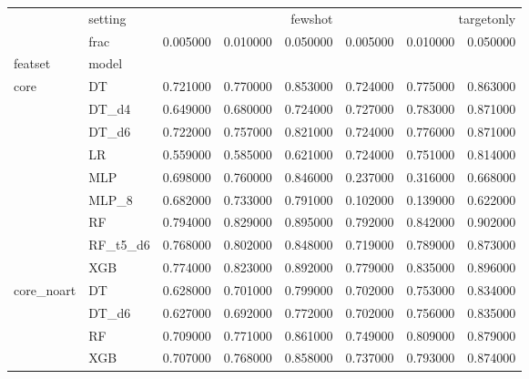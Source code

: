 \begin{tabular}{llrrrrrr}
\toprule
 & setting & \multicolumn{3}{r}{fewshot} & \multicolumn{3}{r}{targetonly} \\
 & frac & 0.005000 & 0.010000 & 0.050000 & 0.005000 & 0.010000 & 0.050000 \\
featset & model &  &  &  &  &  &  \\
\midrule
\multirow[t]{9}{*}{core} & DT & 0.721000 & 0.770000 & 0.853000 & 0.724000 & 0.775000 & 0.863000 \\
 & DT_d4 & 0.649000 & 0.680000 & 0.724000 & 0.727000 & 0.783000 & 0.871000 \\
 & DT_d6 & 0.722000 & 0.757000 & 0.821000 & 0.724000 & 0.776000 & 0.871000 \\
 & LR & 0.559000 & 0.585000 & 0.621000 & 0.724000 & 0.751000 & 0.814000 \\
 & MLP & 0.698000 & 0.760000 & 0.846000 & 0.237000 & 0.316000 & 0.668000 \\
 & MLP_8 & 0.682000 & 0.733000 & 0.791000 & 0.102000 & 0.139000 & 0.622000 \\
 & RF & 0.794000 & 0.829000 & 0.895000 & 0.792000 & 0.842000 & 0.902000 \\
 & RF_t5_d6 & 0.768000 & 0.802000 & 0.848000 & 0.719000 & 0.789000 & 0.873000 \\
 & XGB & 0.774000 & 0.823000 & 0.892000 & 0.779000 & 0.835000 & 0.896000 \\
\cline{1-8}
\multirow[t]{4}{*}{core_noart} & DT & 0.628000 & 0.701000 & 0.799000 & 0.702000 & 0.753000 & 0.834000 \\
 & DT_d6 & 0.627000 & 0.692000 & 0.772000 & 0.702000 & 0.756000 & 0.835000 \\
 & RF & 0.709000 & 0.771000 & 0.861000 & 0.749000 & 0.809000 & 0.879000 \\
 & XGB & 0.707000 & 0.768000 & 0.858000 & 0.737000 & 0.793000 & 0.874000 \\
\cline{1-8}
\bottomrule
\end{tabular}

